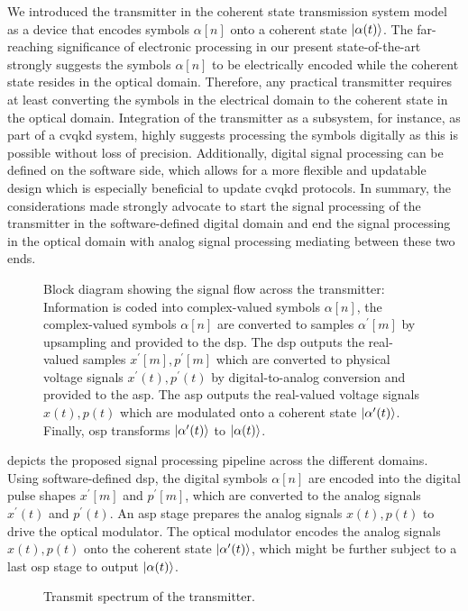 We introduced the transmitter in the coherent state transmission system model as a device that encodes symbols $\alpha[n]$ onto a coherent state $\ket{\alpha(t)}$.
The far-reaching significance of electronic processing in our present state-of-the-art strongly suggests the symbols $\alpha[n]$ to be electrically encoded while the coherent state resides in the optical domain.
Therefore, any practical transmitter requires at least converting the symbols in the electrical domain to the coherent state in the optical domain.
Integration of the transmitter as a subsystem, for instance, as part of a \gls{cvqkd} system, highly suggests processing the symbols digitally as this is possible without loss of precision.
Additionally, digital signal processing can be defined on the software side, which allows for a more flexible and updatable design which is especially beneficial to update \gls{cvqkd} protocols.
In summary, the considerations made strongly advocate to start the signal processing of the transmitter in the software-defined digital domain and end the signal processing in the optical domain with analog signal processing mediating between these two ends.
\begin{figure}[htb]
	\centering
	
	\caption{Block diagram showing the signal flow across the transmitter: Information is coded into complex-valued symbols $\alpha[n]$, the complex-valued symbols $\alpha[n]$ are converted to samples $\alpha^\prime[m]$ by upsampling and provided to the \gls{dsp}. The \gls{dsp} outputs the real-valued samples $x^\prime[m],p^\prime[m]$ which are converted to physical voltage signals $x^\prime(t),p^\prime(t)$ by digital-to-analog conversion and provided to the \gls{asp}. The \gls{asp} outputs the real-valued voltage signals $x(t),p(t)$ which are modulated onto a coherent state $\ket{\alpha^\prime(t)}$. Finally, \gls{osp} transforms $\ket{\alpha^\prime(t)}$ to $\ket{\alpha(t)}$.}\label{fig:transmitter}
\end{figure}
 depicts the proposed signal processing pipeline across the different domains.
Using software-defined \gls{dsp}, the digital symbols $\alpha[n]$ are encoded into the digital pulse shapes $x^\prime[m]$ and $p^\prime[m]$, which are converted to the analog signals $x^\prime(t)$ and $p^\prime(t)$.
An \gls{asp} stage prepares the analog signals $x(t),p(t)$ to drive the optical modulator.
The optical modulator encodes the analog signals $x(t), p(t)$ onto the coherent state $\ket{\alpha^\prime(t)}$, which might be further subject to a last \gls{osp} stage to output $\ket{\alpha(t)}$.
\begin{figure}[htb]
	\centering
	
	\caption{Transmit spectrum of the transmitter.}\label{fig:transmit_spectrum}
\end{figure}

